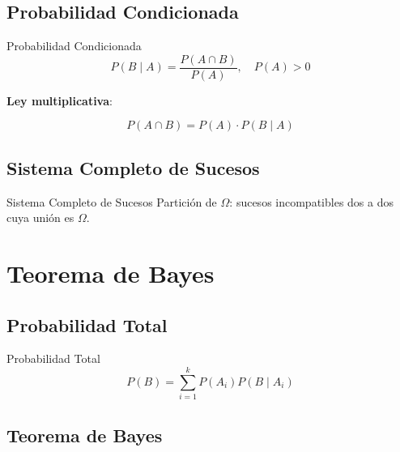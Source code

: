 \documentclass[
  ignorenonframetext,
  aspectratio=169,
]{beamer}
\begin{document}
\begin{frame}
\end{frame}

\subsection{Probabilidad Condicionada}\label{probabilidad-condicionada}

\begin{frame}{Probabilidad Condicionada}
\[P(B \mid A) = \frac{P(A \cap B)}{P(A)}, \quad P(A) > 0\]

\textbf{Ley multiplicativa}:

\[P(A \cap B) = P(A) \cdot P(B \mid A)\]
\end{frame}

\begin{frame}
\end{frame}

\subsection{Sistema Completo de
Sucesos}\label{sistema-completo-de-sucesos}

\begin{frame}{Sistema Completo de Sucesos}
Partición de \(\Omega\): sucesos incompatibles dos a dos cuya unión es
\(\Omega\).
\end{frame}

\begin{frame}
\end{frame}

\section{Teorema de Bayes}\label{teorema-de-bayes}

\subsection{Probabilidad Total}\label{probabilidad-total}

\begin{frame}{Probabilidad Total}
\[P(B) = \sum_{i=1}^{k} P(A_i) P(B \mid A_i)\]
\end{frame}

\subsection{Teorema de Bayes}\label{teorema-de-bayes-1}
\end{document}
